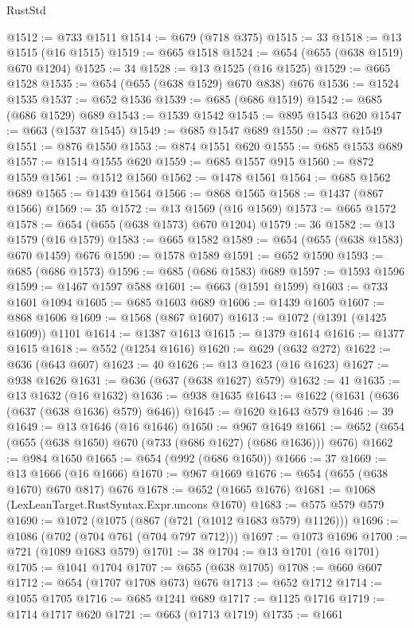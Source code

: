 \begin{lexlean}{RustStd}
\begin{coremodule}
{\begin{coremodule}
{{{{{{{{{{{{{{{@1512 := @733 @1511
@1514 := @679 (@718 @375)
@1515 := 33
@1518 := @13 @1515 (@16 @1515)
@1519 := @665 @1518
@1524 := @654 (@655 (@638 @1519) @670 @1204)
@1525 := 34
@1528 := @13 @1525 (@16 @1525)
@1529 := @665 @1528
@1535 := @654 (@655 (@638 @1529) @670 @838) @676
@1536 := @1524 @1535
@1537 := @652 @1536
@1539 := @685 (@686 @1519)
@1542 := @685 (@686 @1529) @689
@1543 := @1539 @1542
@1545 := @895 @1543 @620
@1547 := @663 (@1537 @1545)
@1549 := @685 @1547 @689
@1550 := @877 @1549
@1551 := @876 @1550
@1553 := @874 @1551 @620
@1555 := @685 @1553 @689
@1557 := @1514 @1555 @620
@1559 := @685 @1557 @915
@1560 := @872 @1559
@1561 := @1512 @1560
@1562 := @1478 @1561
@1564 := @685 @1562 @689
@1565 := @1439 @1564
@1566 := @868 @1565
@1568 := @1437 (@867 @1566)
@1569 := 35
@1572 := @13 @1569 (@16 @1569)
@1573 := @665 @1572
@1578 := @654 (@655 (@638 @1573) @670 @1204)
@1579 := 36
@1582 := @13 @1579 (@16 @1579)
@1583 := @665 @1582
@1589 := @654 (@655 (@638 @1583) @670 @1459) @676
@1590 := @1578 @1589
@1591 := @652 @1590
@1593 := @685 (@686 @1573)
@1596 := @685 (@686 @1583) @689
@1597 := @1593 @1596
@1599 := @1467 @1597 @588
@1601 := @663 (@1591 @1599)
@1603 := @733 @1601 @1094
@1605 := @685 @1603 @689
@1606 := @1439 @1605
@1607 := @868 @1606
@1609 := @1568 (@867 @1607)
@1613 := @1072 (@1391 (@1425 @1609)) @1101
@1614 := @1387 @1613
@1615 := @1379 @1614
@1616 := @1377 @1615
@1618 := @552 (@1254 @1616)
@1620 := @629 (@632 @272)
@1622 := @636 (@643 @607)
@1623 := 40
@1626 := @13 @1623 (@16 @1623)
@1627 := @938 @1626
@1631 := @636 (@637 (@638 @1627) @579)
@1632 := 41
@1635 := @13 @1632 (@16 @1632)
@1636 := @938 @1635
@1643 := @1622 (@1631 (@636 (@637 (@638 @1636) @579) @646))
@1645 := @1620 @1643 @579
@1646 := 39
@1649 := @13 @1646 (@16 @1646)
@1650 := @967 @1649
@1661 := @652 (@654 (@655 (@638 @1650) @670 (@733 (@686 @1627) (@686 @1636))) @676)
@1662 := @984 @1650
@1665 := @654 (@992 (@686 @1650))
@1666 := 37
@1669 := @13 @1666 (@16 @1666)
@1670 := @967 @1669
@1676 := @654 (@655 (@638 @1670) @670 @817) @676
@1678 := @652 (@1665 @1676)
@1681 := @1068 (LexLeanTarget.RustSyntax.Expr.uncons @1670)
@1683 := @575 @579 @579
@1690 := @1072 (@1075 (@867 (@721 (@1012 @1683 @579) @1126)))
@1696 := @1086 (@702 (@704 @761 (@704 @797 @712)))
@1697 := @1073 @1696
@1700 := @721 (@1089 @1683 @579)
@1701 := 38
@1704 := @13 @1701 (@16 @1701)
@1705 := @1041 @1704
@1707 := @655 (@638 @1705)
@1708 := @660 @607
@1712 := @654 (@1707 @1708 @673) @676
@1713 := @652 @1712
@1714 := @1055 @1705
@1716 := @685 @1241 @689
@1717 := @1125 @1716
@1719 := @1714 @1717 @620
@1721 := @663 (@1713 @1719)
@1735 := @1661
}}}}}}}}}}}}}}}
\end{coremodule}}
\end{coremodule}
\end{lexlean}

